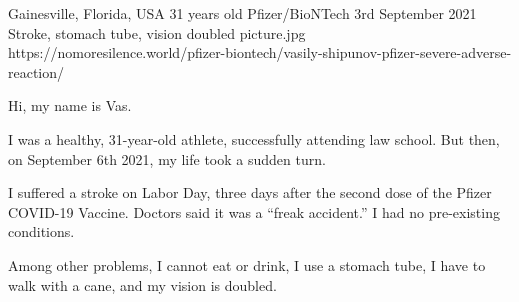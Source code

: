 {Gainesville, Florida, USA}
{31 years old}
{Pfizer/BioNTech}
{3rd September 2021}
{Stroke, stomach tube, vision doubled}
{picture.jpg}
{https://nomoresilence.world/pfizer-biontech/vasily-shipunov-pfizer-severe-adverse-reaction/}
{

Hi, my name is Vas.

I was a healthy, 31-year-old athlete, successfully attending law school. But
then, on September 6th 2021, my life took a sudden turn.

I suffered a stroke on Labor Day, three days after the second dose of the Pfizer
COVID-19 Vaccine. Doctors said it was a “freak accident.” I had no pre-existing
conditions.

Among other problems, I cannot eat or drink, I use a stomach tube, I have to
walk with a cane, and my vision is doubled.

}
